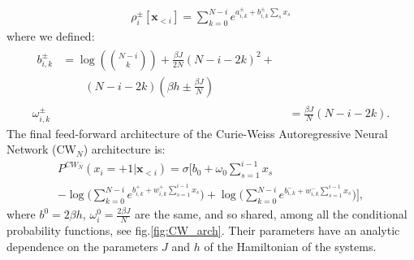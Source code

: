 \documentclass[aps,physrev,10pt,floatfix,reprint]{revtex4-2}
\begin{document}
 \begin{eqnarray*}
 \rho_i^{\pm}[\mathbf{x}_{<i}] = \sum_{k=0}^{N-i} e^{a_{i,k}^{\pm} + b_{i,k}^{\pm} \sum_s x_s} 
\end{eqnarray*}
where we defined:
\begin{align}
\label{eq:params}
\begin{split}
b_{i,k}^{\pm} & = \log\left(\binom{N-i}{k}\right) + \frac{\beta J}{2N}\left(N-i-2k\right)^{2}+ \\
& \qquad \left(N-i-2k\right)\left(\beta h \pm \frac{\beta J}{N}\right)
\end{split} \\
\omega_{i,k}^{\pm} & = \frac{\beta J}{N}\left(N-i-2k\right).
\label{eq:CW_params}
\end{align}
The final feed-forward architecture of the Curie-Weiss Autoregressive Neural Network (CW$_N$) architecture is:
\begin{multline*}
P^{CW_{N}}\left(x_{i}=+1|\mathbf{x}_{<i}\right)  =   \sigma \bigg[b_{0}+\omega_{0}\sum_{s=1}^{i-1}x_{s}\\
-\log\big(\sum_{k=0}^{N-i}e^{b_{i,k}^{+} + 
w_{i,k}^{+}\sum_{s=1}^{i-1}x_{s}}\big)+\log\big(\sum_{k=0}^{N-i}e^{b_{i,k}^{-} + w_{i,k}^{-}\sum_{s=1}^{i-1}x_{s}}\big)\bigg],
\end{multline*}
where $b^0=2\beta h$, $\omega^0_i = \frac{2\beta J}{N}$ are the same, and so shared, among all the conditional probability functions, see fig.\ref{fig:CW_arch}. Their parameters have an analytic dependence on the parameters $J$ and $h$ of the Hamiltonian of the systems. 
\end{document}
